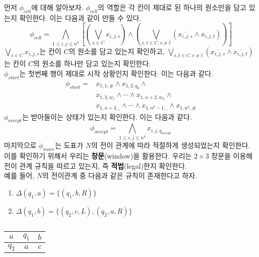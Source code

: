 \documentclass[b5paper, 10pt]{book}
\theoremstyle{definition}
\newenvironment{pf*}{\pushQED{\qed}\pf}{\popQED\endpf}
\begin{document}
\begin{pf*}
    먼저 $\phi_{cell}$에 대해 알아보자. $\phi_{cell}$의 역할은 각 칸이 제대로 된 하나의 원소만을 담고 있는지 확인한다.
    이는 다음과 같이 만들 수 있다.
    $$\phi_{cell} = \bigwedge_{1 \le i,j \le n^k} \left[\left(\bigvee_{s\in C} x_{i,j,s}\right)
    \wedge \left(\bigvee_{s,t \in C, s \neq t} \left(\overline{x_{i,j,s}} \wedge 
    \overline{x_{i,j,t}}\right) \right)\right]$$
    $\bigvee_{s\in C} x_{i,j,s}$는 칸이 $C$의 원소를 담고 있는지 확인하고, $\bigvee_{s,t \in C, s \neq t} 
    \left(\overline{x_{i,j,s}} \wedge 
    \overline{x_{i,j,t}}\right)$는 칸이 $C$의 원소를 하나만 담고 있는지 확인한다. \\ 
    $\phi_{start}$는 첫번째 행이 제대로 시작 상황인지 확인한다. 이는 다음과 같다.
    \begin{align*}
        \phi_{start} = &x_{1,1,\#} \wedge x_{1,2,q_0} \wedge \\ 
        &x_{1,3,w_1} \wedge \cdots \wedge x_{1,n+2, w_n} \wedge \\ 
        &x_{1,n+3,\_} \wedge \cdots \wedge x_{1,n^k - 1 , \_} \wedge x_{1, n^k , \#}
    \end{align*} 
    $\phi_{accept}$는 받아들이는 상태가 있는지 확인한다. 이는 다음과 같다.
    $$\phi_{accept} = \bigwedge_{1 \le i,j \le n^k} x_{i,j,q_{accept}}$$
    마지막으로 $\phi_{move}$는 도표가 $N$의 전이 관계에 따라 적절하게 생성되었는지 확인한다. 이를 확인하기 
    위해서 우리는 \textbf{창문}(window)을 활용한다. 우리는 $2 \times 3$ 창문을 이용해 전이 관계 규칙을
    따르고 있는지, 즉 \textbf{적법}(legal)한지 확인한다.\\
    예를 들어, $N$의 전이관계 중 다음과 같은 규칙이 존재한다고 하자. 
    \begin{enumerate}
        \item $\Delta(q_1, a) = \{(q_1, b, R)\}$
        \item $\Delta(q_1, b) = \{(q_2,c,L),(q_2,a,R)\}$
    \end{enumerate}
    \begin{table}[!ht]
        \begin{subtable}[h]{0.3\textwidth}
            \centering
            \begin{tabular}{ | c | c | c|}
            \hline 
            $a$ & $q_1$ & $b$ \\ 
            \hline 
            $q_2$ & $a$ & $c$ \\ 
            \hline
           \end{tabular}
           \caption{}
        \end{subtable}
        \hfill

\end{table}
\end{pf*}
\end{document}
